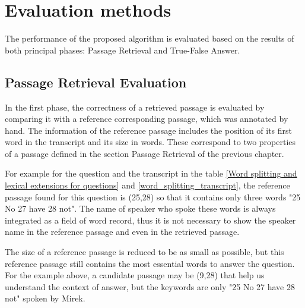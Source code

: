 \chapter{Evaluation methods}

The performance of the proposed algorithm is evaluated based on the results of both principal phases: Passage Retrieval and True-False Answer. 




\section{Passage Retrieval Evaluation}
In the first phase, the correctness of a retrieved passage is evaluated by comparing it with a reference corresponding passage, which was annotated by hand. The information of the reference passage includes the position of its first word in the transcript and its size in words. These correspond to two properties of a passage defined in the section Passage Retrieval of the previous chapter. 

For example for the question and the transcript in the table \ref{Word splitting and lexical extensions for questions} and \ref{word_splitting_transcript}, the reference passage found for this question is (25,28) so that it contains only three words "25 No 27 have 28 not". The name of speaker who spoke these words is always integrated as a field of word record, thus it is not necessary to show the speaker name in the reference passage and even in the retrieved passage.

The size of a reference passage is reduced to be as small as possible, but this reference passage still contains the most essential words to answer the question. For the example above, a candidate passage may be (9,28) that help us understand the context of answer, but the keywords are only "25 No 27 have 28 not" spoken by Mirek.


